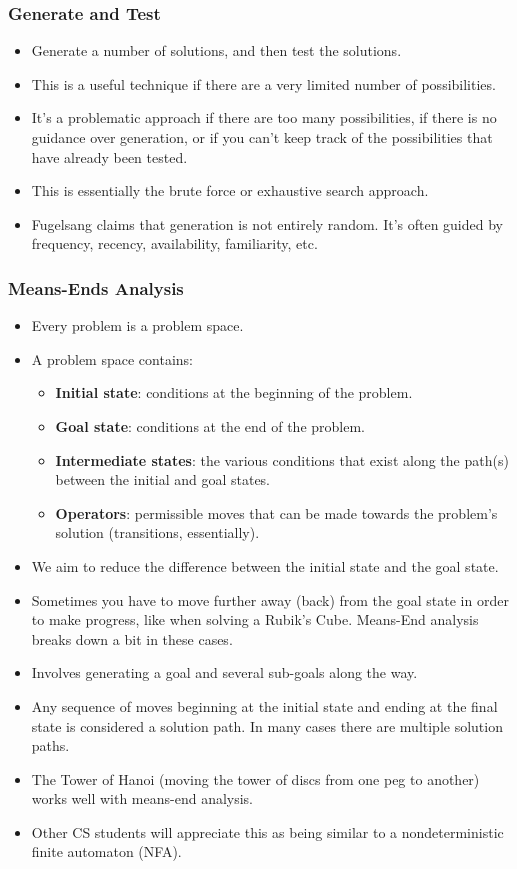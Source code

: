 \documentclass[]{article}
\begin{document}
			\subsubsection{Generate and Test}
				\begin{itemize}
					\item Generate a number of solutions, and then test the solutions.
					\item This is a useful technique if there are a very limited number of possibilities.
					\item It's a problematic approach if there are too many possibilities, if there is no guidance over generation, or if you can't keep track of the possibilities that have already been tested.
					\item This is essentially the brute force or exhaustive search approach.
					\item Fugelsang claims that generation is not entirely random. It's often guided by frequency, recency, availability, familiarity, etc.
				\end{itemize}

			\subsubsection{Means-Ends Analysis}
				\begin{itemize}
					\item Every problem is a problem space.
					\item A problem space contains:
						\begin{itemize}
							\item \textbf{Initial state}: conditions at the beginning of the problem.
							\item \textbf{Goal state}: conditions at the end of the problem.
							\item \textbf{Intermediate states}: the various conditions that exist along the path(s) between the initial and goal states.
							\item \textbf{Operators}: permissible moves that can be made towards the problem's solution (transitions, essentially).
						\end{itemize}
					\item We aim to reduce the difference between the initial state and the goal state.
					\item Sometimes you have to move further away (back) from the goal state in order to make progress, like when solving a Rubik's Cube. Means-End analysis breaks down a bit in these cases.
					\item Involves generating a goal and several sub-goals along the way.
					\item Any sequence of moves beginning at the initial state and ending at the final state is considered a solution path. In many cases there are multiple solution paths.
					\item The Tower of Hanoi (moving the tower of discs from one peg to another) works well with means-end analysis.
					\item Other CS students will appreciate this as being similar to a nondeterministic finite automaton (NFA).
				\end{itemize}
\end{document}
